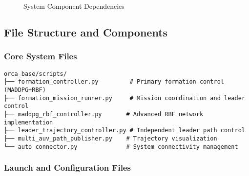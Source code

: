 \documentclass[11pt,a4paper]{article}
\begin{document}
\begin{figure}[h!]
\centering
{}
\caption{System Component Dependencies}
\label{fig:dependencies}
\end{figure}

\subsection{File Structure and Components}

\subsubsection{Core System Files}

\begin{lstlisting}[caption=Core System Organization]
orca_base/scripts/
├── formation_controller.py         # Primary formation control (MADDPG+RBF)
├── formation_mission_runner.py     # Mission coordination and leader control
├── maddpg_rbf_controller.py       # Advanced RBF network implementation
├── leader_trajectory_controller.py # Independent leader path control
├── multi_auv_path_publisher.py    # Trajectory visualization
└── auto_connector.py              # System connectivity management
\end{lstlisting}

\subsubsection{Launch and Configuration Files}
\end{document}
